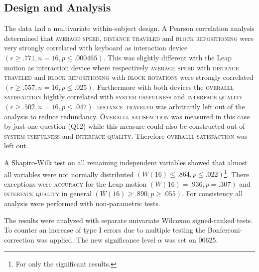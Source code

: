 \subsection{Design and Analysis}
The data had a multivariate within-subject design. A Pearson correlation analysis determined that \textsc{average speed}, \textsc{distance traveled} and \textsc{block repositioning} were very strongly correlated with keyboard as interaction device $(r \geq .771, n = 16, p \leq .000465)$. This was slightly different with the Leap motion as interaction device where respectively \textsc{average speed} with \textsc{distance traveled} and \textsc{block repositioning} with \textsc{block rotations} were strongly correlated $(r  \geq .557, n = 16, p \leq .025)$. Furthermore with both devices the \textsc{overalll satisfaction} hightly correlated with \textsc{system usefulness} and \textsc{interface quality}$(r  \geq .502, n = 16, p \leq .047)$. \textsc{distance traveled} was arbitrarily left out of the analysis to reduce redundancy. \textsc{Overalll satisfaction} was measured in this case by just one question (Q12) while this measure could also be constructed out of \textsc{system usefulness} and \textsc{interface quality}. Therefore \textsc{overalll satisfaction} was left out.

A Shapiro-Wilk test on all remaining independent variables showed that almost all variables were not normally distributed $(W(16) \leq .864, p \leq .022 )$\footnote{For only the significant results.}. There exceptions were \textsc{accuracy} for the Leap motion $(W(16) = .936, p = .307)$ and \textsc{interface quality} in general $(W(16) \geq .890, p \geq .055)$. For consistency all analysis were performed with non-parametric tests.

The results were analyzed with separate univariate Wilcoxon signed-ranked tests. To counter an increase of type I errors due to multiple testing the Bonferroni-correction was applied\cite{dunn61}. The new significance level $\alpha$ was set on $00625$.
